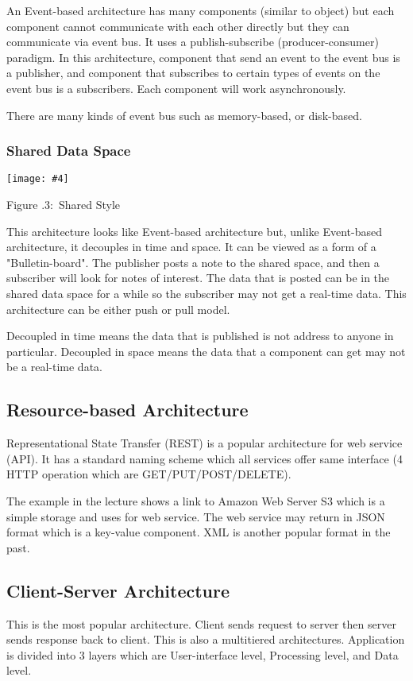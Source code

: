 \documentclass[twoside]{article}
\newcounter{lecnum}
\newcommand{\fig}[4]{
            \centerline{\texttt{[image: \#4]}}
            \begin{center}
            Figure \thelecnum.#1:~#3
            \end{center}
    }
\begin{document}
An Event-based architecture has many components (similar to object) but each component cannot communicate with each other directly but they can communicate via event bus. It uses a publish-subscribe (producer-consumer) paradigm. In this architecture, component that send an event to the event bus is a publisher, and component that subscribes to certain types of events on the event bus is a subscribers. Each component will work asynchronously.

There are many kinds of event bus such as memory-based, or disk-based. 

\subsubsection{Shared Data Space}
\fig{3}{0.5}{Shared Style}{shared.png}

This architecture looks like Event-based architecture but, unlike Event-based architecture, it decouples in time and space.  It can be viewed as a form of a "Bulletin-board".  The publisher posts a note to the shared space, and then a subscriber will look for notes of interest. The data that is posted can be in the shared data space for a while so the subscriber may not get a real-time data. This architecture can be either push or pull model.

Decoupled in time means the data that is published is not address to anyone in particular.
Decoupled in space means the data that a component can get may not be a real-time data.

\subsection{Resource-based Architecture}

Representational State Transfer (REST) is a popular architecture for web service (API). It has a standard naming scheme which all services offer same interface (4 HTTP operation which are GET/PUT/POST/DELETE).  

The example in the lecture shows a link to Amazon Web Server S3 which is a simple storage and uses for web service.
The web service may return in JSON format which is a key-value component. XML is another popular format in the past.

\subsection{Client-Server Architecture}

This is the most popular architecture.  Client sends request to server then server sends response back to client.  This is also a multitiered architectures. Application is divided into 3 layers which are User-interface level, Processing level, and Data level.
\end{document}
